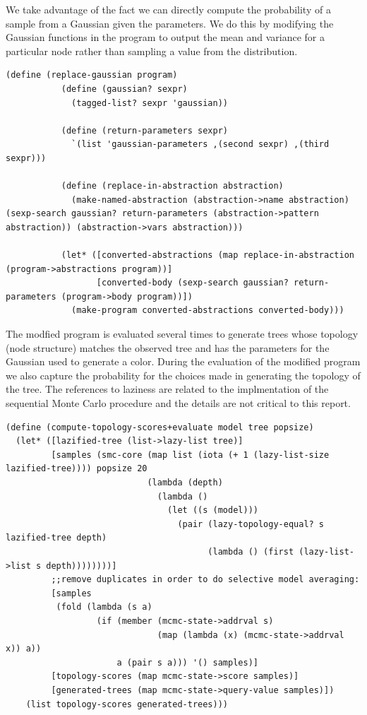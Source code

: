 \documentclass[a4paper,10pt]{article}
\begin{document}
We take advantage of the fact we can directly compute the probability of a sample from a Gaussian given the parameters.  We do this by modifying the Gaussian functions in the program to output the mean and variance for a particular node rather than sampling a value from the distribution.
\begin{lstlisting}[frame=trBL]
(define (replace-gaussian program)
           (define (gaussian? sexpr)
             (tagged-list? sexpr 'gaussian))

           (define (return-parameters sexpr)
             `(list 'gaussian-parameters ,(second sexpr) ,(third sexpr)))

           (define (replace-in-abstraction abstraction)
             (make-named-abstraction (abstraction->name abstraction) (sexp-search gaussian? return-parameters (abstraction->pattern abstraction)) (abstraction->vars abstraction)))

           (let* ([converted-abstractions (map replace-in-abstraction (program->abstractions program))]
                  [converted-body (sexp-search gaussian? return-parameters (program->body program))])
             (make-program converted-abstractions converted-body)))
\end{lstlisting}
The modfied program is evaluated several times to generate trees whose topology (node structure) matches the observed tree and has the parameters for the Gaussian used to generate a color.  During the evaluation of the modified program we also capture the probability for the choices made in generating the topology of the tree.  The references to laziness are related to the implmentation of the sequential Monte Carlo procedure and the details are not critical to this report.
\begin{lstlisting}[frame=trBL]
(define (compute-topology-scores+evaluate model tree popsize)
  (let* ([lazified-tree (list->lazy-list tree)]
         [samples (smc-core (map list (iota (+ 1 (lazy-list-size  lazified-tree)))) popsize 20
                            (lambda (depth)
                              (lambda ()
                                (let ((s (model)))
                                  (pair (lazy-topology-equal? s lazified-tree depth)
                                        (lambda () (first (lazy-list->list s depth))))))))]
         ;;remove duplicates in order to do selective model averaging:
         [samples
          (fold (lambda (s a)
                  (if (member (mcmc-state->addrval s)
                              (map (lambda (x) (mcmc-state->addrval x)) a))
                      a (pair s a))) '() samples)]
         [topology-scores (map mcmc-state->score samples)]
         [generated-trees (map mcmc-state->query-value samples)])
    (list topology-scores generated-trees)))
\end{lstlisting}
\end{document}
